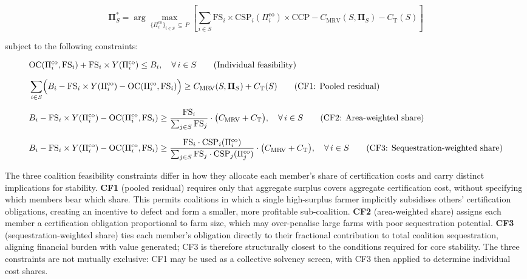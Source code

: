 \documentclass[manuscript, screen, review, anonymous]{acmart}
\begin{document}
\begin{equation}
\boldsymbol{\Pi}_S^* = \arg\max_{\{\Pi_i^{\text{co}}\}_{i \in S} \,\subseteq\, P}
    \left[\sum_{i \in S}
        \text{FS}_i \times \text{CSP}_i(\Pi_i^{\text{co}}) \times \text{CCP}
    - C_{\text{MRV}}(S, \boldsymbol{\Pi}_S)
    - C_{\text{T}}(S)\right]
\end{equation}

subject to the following constraints:

\begin{align}
    &\text{OC}(\Pi_i^{\text{co}}, \text{FS}_i) + \text{FS}_i \times Y(\Pi_i^{\text{co}}) \leq B_i,
    \quad \forall\, i \in S
    \tag{Individual feasibility} \\[6pt]
    &\sum_{i \in S} \Bigl(B_i - \text{FS}_i \times Y(\Pi_i^{\text{co}}) - \text{OC}(\Pi_i^{\text{co}}, \text{FS}_i)\Bigr)
    \geq C_{\text{MRV}}(S, \boldsymbol{\Pi}_S) + C_{\text{T}}(S)
    \tag{CF1: Pooled residual} \\[6pt]
    &B_i - \text{FS}_i \times Y(\Pi_i^{\text{co}}) - \text{OC}(\Pi_i^{\text{co}}, \text{FS}_i) \geq
    \frac{\text{FS}_i}
         {\sum_{j \in S} \text{FS}_j}
    \cdot \bigl(C_{\text{MRV}} + C_{\text{T}}\bigr),
    \quad \forall\, i \in S
    \tag{CF2: Area-weighted share} \\[6pt]
    &B_i - \text{FS}_i \times Y(\Pi_i^{\text{co}}) - \text{OC}(\Pi_i^{\text{co}}, \text{FS}_i) \geq
    \frac{\text{FS}_i \cdot \text{CSP}_i(\Pi_i^{\text{co}})}
         {\sum_{j \in S} \text{FS}_j \cdot \text{CSP}_j(\Pi_j^{\text{co}})}
    \cdot \bigl(C_{\text{MRV}} + C_{\text{T}}\bigr),
    \quad \forall\, i \in S
    \tag{CF3: Sequestration-weighted share}
\end{align}

\noindent The three coalition feasibility constraints differ in how they
allocate each member's share of certification costs and carry distinct
implications for stability. \textbf{CF1} (pooled residual) requires only that
aggregate surplus covers aggregate certification cost, without specifying which
members bear which share. This permits coalitions in which a single high-surplus
farmer implicitly subsidises others' certification obligations, creating an
incentive to defect and form a smaller, more profitable sub-coalition.
\textbf{CF2} (area-weighted share) assigns each member a certification
obligation proportional to farm size, which may over-penalise large farms with
poor sequestration potential. \textbf{CF3} (sequestration-weighted share) ties
each member's obligation directly to their fractional contribution to total
coalition sequestration, aligning financial burden with value generated; CF3 is
therefore structurally closest to the conditions required for core stability.
The three constraints are not mutually exclusive: CF1 may be used as a
collective solvency screen, with CF3 then applied to determine individual cost
shares.
\end{document}
